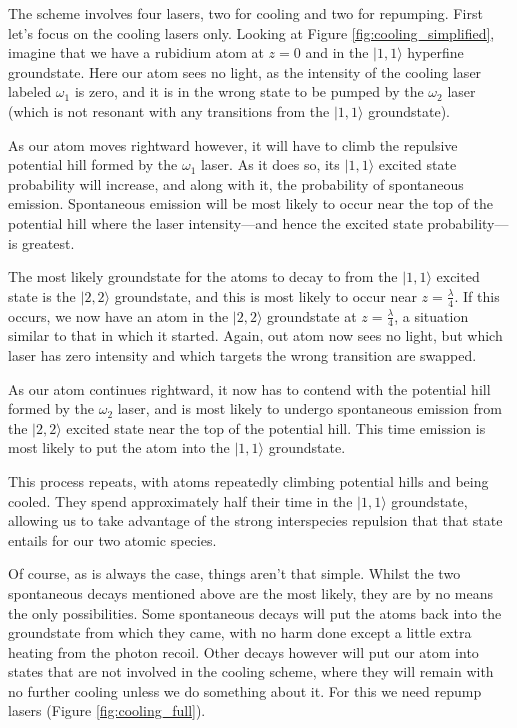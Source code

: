 The scheme involves four lasers, two for cooling and two for repumping. First let's focus on the cooling lasers only. Looking at Figure \ref{fig:cooling_simplified}, imagine that we have a rubidium atom at $z=0$ and in the $|1,1\rangle$ hyperfine groundstate. Here our atom sees no light, as the intensity of the cooling laser labeled $\omega_1$ is zero, and it is in the wrong state to be pumped by the $\omega_2$ laser (which is not resonant with any transitions from the $|1,1\rangle$ groundstate).

As our atom moves rightward however, it will have to climb the repulsive potential hill formed by the $\omega_1$ laser. As it does so, its $|1,1\rangle$ excited state probability will increase, and along with it, the probability of spontaneous emission. Spontaneous emission will be most likely to occur near the top of the potential hill where the laser intensity---and hence the excited state probability---is greatest.

The most likely groundstate for the atoms to decay to from the $|1,1\rangle$ excited state is the $|2,2\rangle$ groundstate, and this is most likely to occur near $z=\frac\lambda4$. If this occurs, we now have an atom in the $|2,2\rangle$ groundstate at $z=\frac\lambda4$, a situation similar to that in which it started. Again, out atom now sees no light, but which laser has zero intensity and which targets the wrong transition are swapped.

As our atom continues rightward, it now has to contend with the potential hill formed by the $\omega_2$ laser, and is most likely to undergo spontaneous emission from the $|2,2\rangle$ excited state near the top of the potential hill. This time emission is most likely to put the atom into the $|1,1\rangle$ groundstate.

This process repeats, with atoms repeatedly climbing potential hills and being cooled. They spend approximately half their time in the $|1,1\rangle$ groundstate, allowing us to take advantage of the strong interspecies repulsion that that state entails for our two atomic species.

Of course, as is always the case, things aren't that simple. Whilst the two spontaneous decays mentioned above are the most likely, they are by no means the only possibilities. Some spontaneous decays will put the atoms back into the groundstate from which they came, with no harm done except a little extra heating from the photon recoil. Other decays however will put our atom into states that are not involved in the cooling scheme, where they will remain with no further cooling unless we do something about it. For this we need repump lasers (Figure \ref{fig:cooling_full}).

